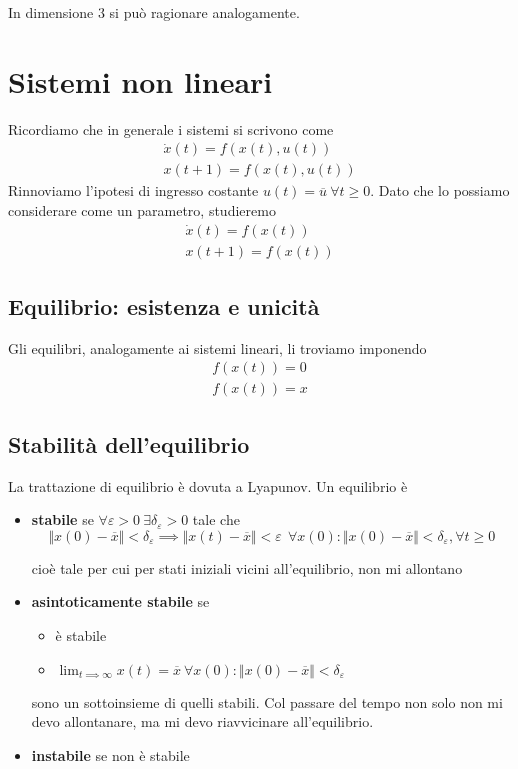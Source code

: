 In dimensione $3$ si può ragionare analogamente.

\chapter{Sistemi non lineari}

Ricordiamo che in generale i sistemi si scrivono come
\begin{gather*}
	\dot{x}(t) =f(x(t) ,u(t))\\
	x(t+1) =f(x(t) ,u(t))
\end{gather*}
Rinnoviamo l'ipotesi di ingresso costante $u(t) =\overline{u} \ \forall t\geq 0$. Dato che lo possiamo considerare come un parametro, studieremo
\begin{gather*}
	\dot{x}(t) =f(x(t))\\
	x(t+1) =f(x(t))
\end{gather*}

\section{Equilibrio: esistenza e unicità}

Gli equilibri, analogamente ai sistemi lineari, li troviamo imponendo
\begin{gather*}
	f(x(t)) =0\\
	f(x(t)) =x
\end{gather*}

\section{Stabilità dell'equilibrio}

La trattazione di equilibrio è dovuta a Lyapunov. Un equilibrio è
\begin{itemize}
	\item \textbf{stabile} se $\forall \varepsilon  >0\ \exists \delta _{\varepsilon }  >0$ tale che\begin{equation*}
	      \Vert x(0) -\overline{x}\Vert < \delta _{\varepsilon } \implies \Vert x(t) -\overline{x}\Vert < \varepsilon \ \ \forall x(0) :\Vert x(0) -\overline{x}\Vert < \delta _{\varepsilon } ,\forall t\geq 0
	\end{equation*}
	
	cioè tale per cui per stati iniziali vicini all'equilibrio, non mi allontano
	\item \textbf{asintoticamente stabile} se
	      \begin{itemize}
	      	\item è stabile
	      	\item $\lim _{t\implies \infty } x(t) =\overline{x} \ \forall x(0) :\Vert x(0) -\overline{x}\Vert < \delta _{\varepsilon }$
	      \end{itemize}
	      
	      sono un sottoinsieme di quelli stabili. Col passare del tempo non solo non mi devo allontanare, ma mi devo riavvicinare all'equilibrio.
	\item \textbf{instabile} se non è stabile
\end{itemize}


